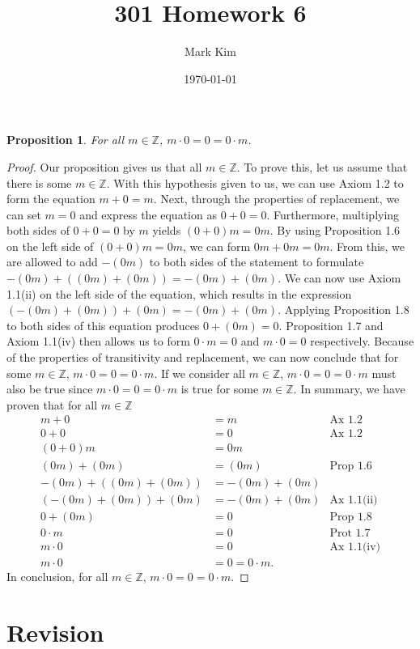 \documentclass[12pt]{amsart}
\title{301 Homework 6}
\author{Mark Kim}
\date{\today}
\newcommand{\Z}{\mathbb{Z}}
\newtheorem*{proposition}{Proposition}
\begin{document}
\maketitle

\begin{proposition}
For all $m\in\Z$, $m\cdot 0 = 0 = 0\cdot m$.
\end{proposition}

\begin{proof}
Our proposition gives us that all $m\in\Z$.  To prove this, let us assume that there is some $m\in\Z$.  With this hypothesis given to us, we can use Axiom 1.2 to form the equation $m+0=m$.  Next, through the properties of replacement, we can set $m=0$ and express the equation as $0+0=0$.  Furthermore, multiplying both sides of $0+0=0$ by $m$ yields $(0+0)m=0m$.  By using Proposition 1.6 on the left side of $(0+0)m=0m$, we can form $0m+0m=0m$.  From this, we are allowed to add $-(0m)$ to both sides of the statement to formulate $-(0m)+((0m)+(0m))=-(0m)+(0m)$.  We can now use Axiom 1.1(ii) on the left side of the equation, which results in the expression $(-(0m)+(0m))+(0m)=-(0m)+(0m)$.  Applying Proposition 1.8 to both sides of this equation produces $0+(0m)=0$.  Proposition 1.7 and Axiom 1.1(iv) then allows us to form $0\cdot m=0$ and $m\cdot 0=0$ respectively.  Because of the properties of transitivity and replacement, we can now conclude that for some $m\in\Z$, $m\cdot 0 = 0 = 0\cdot m$.  If we consider all $m\in\Z$, $m\cdot 0 = 0 = 0\cdot m$ must also be true since $m\cdot 0 = 0 = 0\cdot m$ is true for some $m\in\Z$. In summary, we have proven that for all $m\in\Z$
\begin{align*}
m+0&=m&\text{Ax 1.2}\\
0+0&=0&\text{Ax 1.2}\\
(0+0)m&=0m\\
(0m)+(0m)&=(0m)&\text{Prop 1.6}\\
-(0m)+((0m)+(0m))&=-(0m)+(0m)\\
(-(0m)+(0m))+(0m)&=-(0m)+(0m)&\text{Ax 1.1(ii)}\\
0+(0m)&=0&\text{Prop 1.8}\\
0\cdot m&=0&\text{Prot 1.7}\\
m\cdot 0&=0&\text{Ax 1.1(iv)}\\
m\cdot 0 &= 0 = 0\cdot m.
\end{align*}
In conclusion, for all $m\in\Z$, $m\cdot 0 = 0 = 0\cdot m$.
\end{proof}

\section*{Revision}
\end{document}
